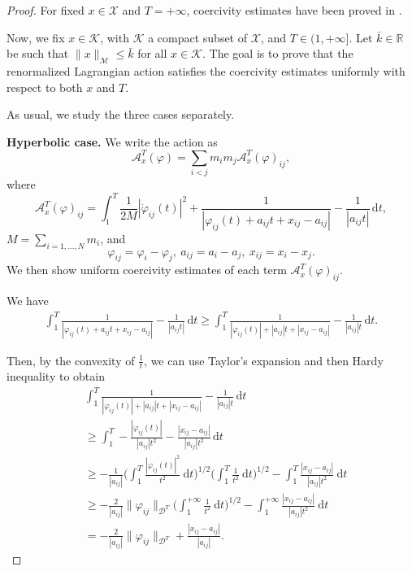 \documentclass[a4paper,10pt]{amsart}
\newcommand{\numberset}{\mathbb}
\newcommand{\R}{\numberset{R}}
\newcommand{\ud}{\mathrm{d}}
\theoremstyle{plain}
\theoremstyle{definition}
\numberwithin{equation}{section}
\numberwithin{thm}{section}
\begin{document}
\begin{proof}
For fixed $x\in\mathcal{X}$ and $T=+\infty$, coercivity estimates have been proved in \cite{PolimeniTerracini}. 

Now, we fix $x\in \mathcal K$, with $\mathcal K$ a compact subset of $\mathcal{X}$, and $T\in(1,+\infty]$. Let $\bar k\in\R$ be such that $\|x\|_\mathcal{M}\leq \bar k$ for all $x\in \mathcal K$. The goal is to prove that the renormalized Lagrangian action satisfies the coercivity estimates uniformly with respect to both $x$ and $T$.

As usual, we study the three cases separately.

\smallskip
{\bf Hyperbolic case.}
We write the action as
\[
\mathcal{A}_{x}^T(\varphi) = \sum_{i<j}m_im_j\mathcal{A}_{x}^T(\varphi)_{ij},
\]
where 
\[
\mathcal{A}_{x}^T(\varphi)_{ij} = \int_{1}^{T}\frac{1}{2M}|\dot\varphi_{ij}(t)|^2 + 
\frac1{|\varphi_{ij}(t)+a_{ij}t+x_{ij}-a_{ij}|}-\frac1{|a_{ij}t|}\,\ud t,
\]
$M=\sum_{i=1,\dots,N}m_i$, and 
\[
\varphi_{ij}=\varphi_i-\varphi_j, \ a_{ij}=a_i-a_j, \ x_{ij}=x_i-x_j.
\]
We then show uniform coercivity estimates of each term $\mathcal{A}_{x}^T(\varphi)_{ij}$.

\smallskip
We have
\begin{displaymath}
\begin{split} 
    \int_{1}^{T} \frac1{|\varphi_{ij}(t)+a_{ij}t+x_{ij}-a_{ij}|}-\frac1{|a_{ij}t|}\,\ud t \ge \int_{1}^{T} \frac{1}{|\varphi_{ij}(t)| +|a_{ij}| t +  |x_{ij} - a_{ij}|} - \frac{1}{|a_{ij}|t}\, \mathrm{d}t.
    \end{split} 
    \end{displaymath} 

    Then, by the convexity of $\frac1t$, we can use Taylor's expansion and then Hardy inequality to obtain
    \[
    \begin{split}
    &\int_{1}^{T} \frac{1}{|\varphi_{ij}(t)| +  |a_{ij}| t +|x_{ij} - a_{ij}|} - \frac{1}{|a_{ij}|t}\, \mathrm{d}t \\
    &\ge \int_{1}^{T} -\frac{|\varphi_{ij}(t)|}{|a_{ij}| t^2 } - \frac{|x_{ij} - a_{ij}|}{|a_{ij}|t^2}\, \mathrm{d}t\\
    &\ge -\frac{1}{|a_{ij}|}\bigg(\int_{1}^{T} \frac{|\varphi_{ij}(t)|^2}{t^2}\ \ud t\bigg)^{1/2}\bigg(\int_{1}^{T}\frac{1}{t^2}\ \ud t\bigg)^{1/2} -\int_{1}^{T} \frac{|x_{ij} - a_{ij}|}{|a_{ij}|t^2}\ \ud t\\
    &\ge -\frac{2}{|a_{ij}|}\|\varphi_{ij}\|_{\mathcal{D}^T}\bigg(\int_{1}^{+\infty}\frac{1}{t^2}\ \ud t\bigg)^{1/2} - \int_{1}^{+\infty} \frac{|x_{ij} - a_{ij}|}{|a_{ij}|t^2}\ \ud t\\
    & = -\frac{2}{|a_{ij}|}\|\varphi_{ij}\|_{\mathcal{D}^T} + \frac{|x_{ij} - a_{ij}|}{|a_{ij}|}.
    \end{split}
    \]


\end{proof}
\end{document}
